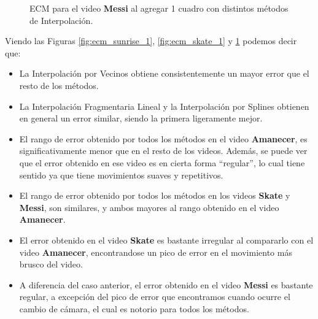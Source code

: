 \begin{figure}[H]
	\centering
	\caption{ECM para el video \textbf{Messi}  al agregar 1 cuadro con distintos métodos de Interpolación.}
	\label{fig:ecm_messi_1}
\end{figure}

Viendo las Figuras \ref{fig:ecm_sunrise_1}, \ref{fig:ecm_skate_1} y \ref{fig:ecm_messi_1} podemos decir que:
\begin{itemize}
    \item La Interpolación por Vecinos obtiene consistentemente un mayor error que
        el resto de los métodos.
    \item La Interpolación Fragmentaria Lineal y la Interpolación por Splines obtienen
        en general un error similar, siendo la primera ligeramente mejor.
    \item El rango de error obtenido por todos los métodos en el video \textbf{Amanecer},
        es significativamente menor que en el resto de los videos. Además, se puede ver
        que el error obtenido en ese video es en cierta forma ``regular'', lo cual
        tiene sentido ya que tiene movimientos suaves y repetitivos.
    \item El rango de error obtenido por todos los métodos en los videos \textbf{Skate} y \textbf{Messi},
        son similares, y ambos mayores al rango obtenido en el video \textbf{Amanecer}.
    \item El error obtenido en el video \textbf{Skate} es bastante irregular
        al compararlo con el video \textbf{Amanecer}, encontrandose un pico de error
        en el movimiento más brusco del video.
    \item A diferencia del caso anterior, el error obtenido en el video \textbf{Messi}
        es bastante regular, a excepción del pico de error que encontramos cuando
        ocurre el cambio de cámara, el cual es notorio para todos los métodos.
\end{itemize}

